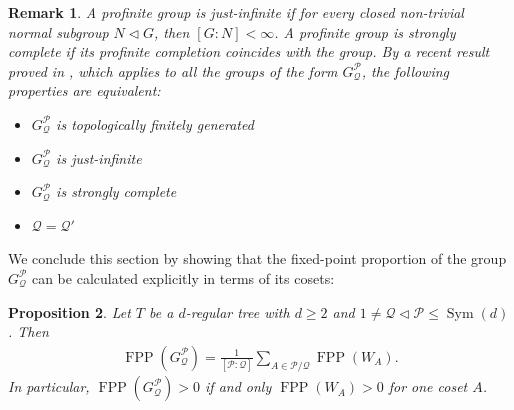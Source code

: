 \documentclass{amsart}
\DeclareMathOperator{\FPP}{FPP}
\DeclareMathOperator{\Sym}{Sym}
\newtheorem{Proposition}{Proposition}[section]
\newtheorem{Remark}[Proposition]{Remark}
\begin{document}
\begin{Remark}
A profinite group is just-infinite if for every closed non-trivial normal subgroup $N \lhd G$, then $[G:N] < \infty$. A profinite group is strongly complete if its profinite completion coincides with the group. By a recent result proved in \cite[Theorem 1]{RadiFiniteType2025}, which applies to all the groups of the form $G_\mathcal{Q}^\mathcal{P}$, the following properties are equivalent:

\begin{itemize}
\item $G_\mathcal{Q}^\mathcal{P}$ is topologically finitely generated
\item $G_\mathcal{Q}^\mathcal{P}$ is just-infinite
\item $G_\mathcal{Q}^\mathcal{P}$ is strongly complete
\item $\mathcal{Q} = \mathcal{Q}'$
\end{itemize}



\end{Remark}

We conclude this section by showing that the fixed-point proportion of the group $G_\mathcal{Q}^\mathcal{P}$ can be calculated explicitly in terms of its cosets:

\begin{Proposition}
Let $T$ be a $d$-regular tree with $d \geq 2$ and $1 \neq \mathcal{Q} \lhd \mathcal{P} \leq \Sym(d)$. Then \begin{align}
\FPP(G_\mathcal{Q}^\mathcal{P}) = \frac{1}{[\mathcal{P}: \mathcal{Q}]} \sum_{A \in \mathcal{P}/\mathcal{Q}} \FPP(W_A). 
\end{align}
In particular, $\FPP(G_\mathcal{Q}^\mathcal{P}) > 0$ if and only $\FPP(W_A) > 0$ for one coset $A$.
\label{Proposition: FPP(GQP) in terms of FPP(A)}
\end{Proposition}
\end{document}
